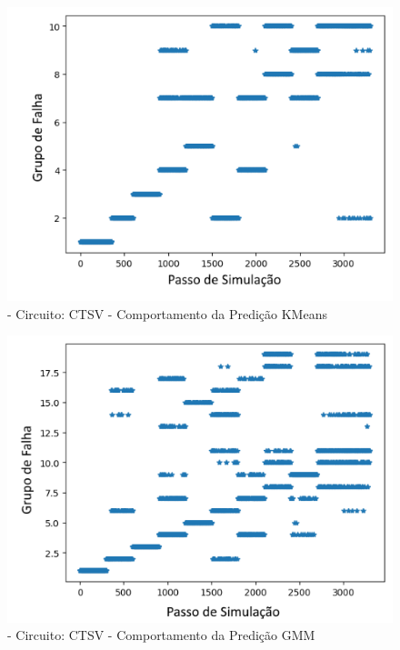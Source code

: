        
        
        \begin{figure}[H]
        \begin{center}
        \includegraphics[width=13cm]{./01_Pre_textuais/ctsv_figs/KMeans_CTSV_mc_+_4bitPRBS_[FALHA]raw.png}
        \caption{\label{fig:DecisionTreeClassifieSalenkey}- Circuito: CTSV - Comportamento da Predição KMeans }
        \end{center}
        \end{figure}
        
        \begin{figure}[H]
        \begin{center}
        \includegraphics[width=13cm]{./01_Pre_textuais/ctsv_figs/GMM_CTSV_mc_+_4bitPRBS_[FALHA]raw.png}
        \caption{\label{fig:DecisionTreeClassifieSalenkey}- Circuito: CTSV - Comportamento da Predição GMM }
        \end{center}
        \end{figure}
    
